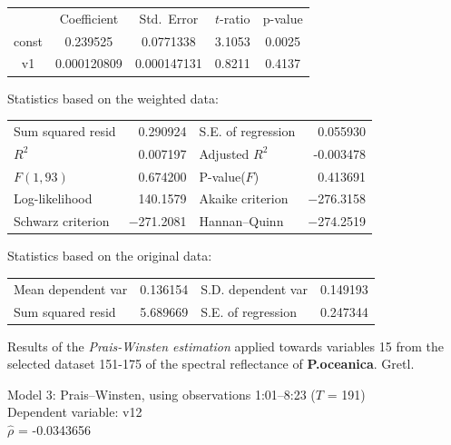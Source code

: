 \documentclass[10pt, a4paper]{article}
\begin{document}
\begin{appendices}
\begin{table}[H]
\begin{center}
\vspace{1em}
\begin{tabular}{|c|c|c|c|c|}
  & {Coefficient} & {Std.\ Error} & {$t$-ratio} & {p-value} \\[1ex]
const &   0.239525 &     0.0771338 & 3.1053 &         0.0025 \\
v1 &   0.000120809 &     0.000147131 &       0.8211 &         0.4137 \\
\end{tabular}

\vspace{1em}Statistics based on the weighted data:

\vspace{1ex}
\begin{tabular}{lrlr}
Sum squared resid &  0.290924 & S.E. of regression &  0.055930 \\
$R^2$ &  0.007197 & Adjusted $R^2$ & -0.003478 \\
$F(1, 93)$ &  0.674200 & P-value($F$) &  0.413691 \\
Log-likelihood &  140.1579 & Akaike criterion & $-$276.3158 \\
Schwarz criterion & $-$271.2081 & Hannan--Quinn & $-$274.2519 \\
\end{tabular}

\vspace{1em}Statistics based on the original data:

\vspace{1ex}
\begin{tabular}{lrlr}
Mean dependent var &  0.136154 & S.D. dependent var &  0.149193 \\
Sum squared resid &  5.689669 & S.E. of regression &  0.247344 \\
\end{tabular}
\end{center}
\end{table}

\begin{table}
\begin{center}
\caption{Results of the \textit{Prais-Winsten estimation} applied towards variables 15 from the selected dataset 151-175 of the spectral reflectance of \textbf{P.oceanica}. Gretl.}
Model 3: Prais--Winsten, using observations 1:01--8:23 ($T$ = 191)\\
Dependent variable: v12\\
$\hat{\rho}$ = -0.0343656


\end{center}
\end{table}
\end{appendices}
\end{document}
